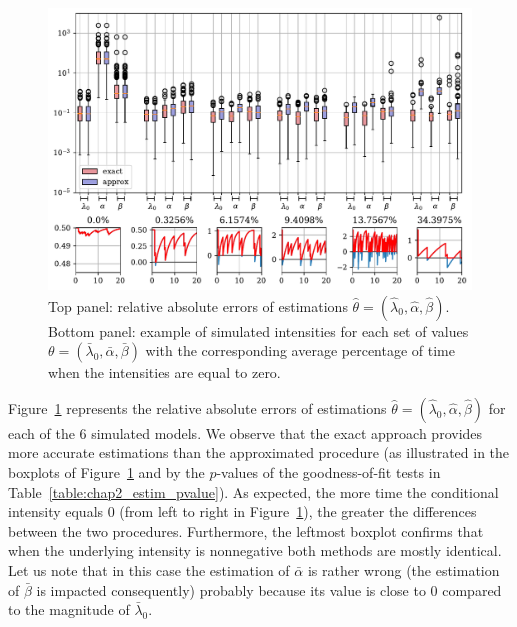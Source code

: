 \begin{figure}[!ht]
  \centering
    \includegraphics[width=\textwidth]{images/chapter2/intensity_boxplot_log_cropped.pdf}%
  \caption{Top panel: relative absolute errors of estimations \(\hat \theta = (\hat \lambda_0, \hat \alpha, \hat \beta)\).
  Bottom panel: example of simulated intensities for each set of values $ \theta = ( \bar \lambda_0,  \bar \alpha,  \bar \beta)$  with the corresponding average percentage of time when the intensities are equal to zero.
  }
  \label{fig:chap2_boxplot_intensity}
\end{figure}

Figure~\ref{fig:chap2_boxplot_intensity} represents the relative absolute errors of estimations \(\hat \theta = (\hat \lambda_0, \hat \alpha, \hat \beta)\) for each of the 6 simulated models.
We observe that the exact approach provides more accurate estimations than the approximated procedure (as illustrated in the boxplots of Figure~\ref{fig:chap2_boxplot_intensity} and by the \(p\)-values of the goodness-of-fit tests in Table~\ref{table:chap2_estim_pvalue}). As expected, the more time the conditional intensity equals 0 (from left to right in Figure~\ref{fig:chap2_boxplot_intensity}), the greater the differences between the two procedures.
Furthermore, the leftmost boxplot confirms that when the underlying intensity is nonnegative both methods are mostly identical.
Let us note that in this case the estimation of \(\bar \alpha\) is rather wrong (the estimation of \(\bar \beta\) is impacted consequently) probably because its value is close to \(0\) compared to the magnitude of \(\bar \lambda_0\).

